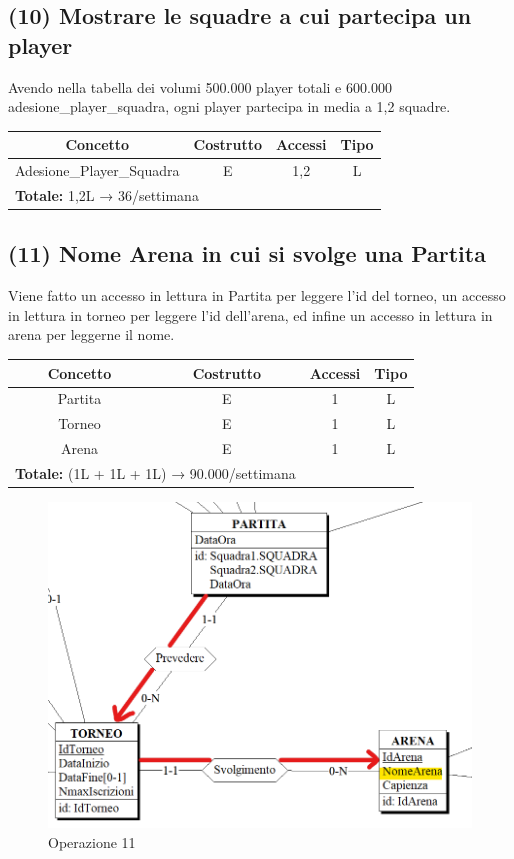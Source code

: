 \documentclass[a4paper,12pt]{report}
\begin{document}
\subsection*{(10) Mostrare le squadre a cui partecipa un player}
Avendo nella tabella dei volumi 500.000 player totali e 600.000 adesione\_player\_squadra, ogni player partecipa in media a 1,2 squadre.
\begin{center}
	\begin{tabular}{|c|c|c|c|}
		\hline\rowcolor{pink}
		Concetto & Costrutto & Accessi & Tipo\\
		\hline\hline		
		Adesione\_Player\_Squadra & E & 1,2 & L\\
		\hline
		\hline
		\multicolumn{2}{l}{%
			\textbf{Totale:} 1,2L → 36/settimana} \\
		\hline
	\end{tabular}
\end{center}
\subsection*{(11) Nome Arena in cui si svolge una Partita}
Viene fatto un accesso in lettura in Partita per leggere l'id del torneo, un accesso in lettura in torneo per leggere l'id dell'arena, ed infine un accesso in lettura in arena per leggerne il nome.
\begin{center}
	\begin{tabular}{|c|c|c|c|}
		\hline\rowcolor{pink}
		Concetto & Costrutto & Accessi & Tipo\\
		\hline\hline		
		Partita & E & 1 & L\\
		\hline
		Torneo & E & 1 & L\\
		\hline
		Arena & E & 1 & L\\
		\hline
		\multicolumn{2}{l}{%
			\textbf{Totale:} (1L + 1L + 1L) → 90.000/settimana} \\
		\hline
	\end{tabular}
\end{center}
\begin{figure}[!htb]
	\centerline{\includegraphics[scale=0.6]{img/op11.png}}
	\caption{Operazione 11}
\end{figure}
\end{document}
